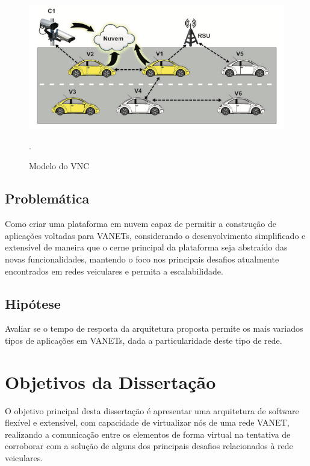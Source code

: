\documentclass[
	12pt,				%
	oneside,			%
	a4paper,			%
	english,			%
	brazil				%
	]{abntex2ppgsi}
\begin{document}
\begin{figure} [t]
	\centering
	\includegraphics[width=0.7\columnwidth]{images/vcn.png}
	\caption{Modelo do VNC \cite{lee2014vehicular}}.
	\label{fig:vcn}
\end{figure}

%

\subsection{Problemática}

Como criar uma plataforma em nuvem capaz de permitir a construção de aplicações voltadas para VANETs, considerando o desenvolvimento simplificado e extensível de maneira que o cerne principal da plataforma seja abstraído das novas funcionalidades, mantendo o foco nos principais desafios atualmente encontrados em redes veiculares e permita a escalabilidade. 

\subsection{Hipótese}

Avaliar se o tempo de resposta da arquitetura proposta permite os mais variados tipos de aplicações em VANETs, dada a particularidade deste tipo de rede.

\section{Objetivos da Dissertação}

O objetivo principal desta dissertação é apresentar uma arquitetura de software flexível e extensível, com capacidade de virtualizar nós de uma rede VANET, realizando a comunicação entre os elementos de forma virtual na tentativa de corroborar com a solução de alguns dos principais desafios relacionados à rede veiculares.
\end{document}
